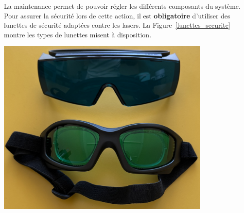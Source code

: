 \begin{minipage}[c]{0.48\textwidth}
    La maintenance permet de pouvoir régler les différents composants du système. Pour assurer la sécurité lors de cette action, il est \textbf{obligatoire} d'utiliser des lunettes de sécurité adaptées contre les lasers. La Figure~\ref{lunettes_securite} montre les types de lunettes misent à disposition.
\end{minipage}\hfill
\begin{minipage}[c]{0.48\textwidth}
    \begin{center}
        \includegraphics[width=0.8\textwidth]{assets/figures/Protections_laser/Securite_electrique/lunettes_securite.jpeg}
    \end{center}
    \label{lunettes_securite}
\end{minipage}